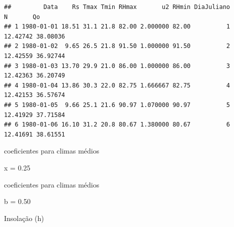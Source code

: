 \documentclass[
]{book}
\newenvironment{Shaded}{\begin{snugshade}}{\end{snugshade}}
\newcommand{\FloatTok}[1]{\textcolor[rgb]{0.00,0.00,0.81}{#1}}
\newcommand{\NormalTok}[1]{#1}
\newcommand{\OperatorTok}[1]{\textcolor[rgb]{0.81,0.36,0.00}{\textbf{#1}}}
\newcommand{\StringTok}[1]{\textcolor[rgb]{0.31,0.60,0.02}{#1}}
\begin{document}
\begin{verbatim}
##         Data    Rs Tmax Tmin RHmax       u2 RHmin DiaJuliano        N       Qo
## 1 1980-01-01 18.51 31.1 21.8 82.00 2.000000 82.00          1 12.42742 38.08036
## 2 1980-01-02  9.65 26.5 21.8 91.50 1.000000 91.50          2 12.42559 36.92744
## 3 1980-01-03 13.70 29.9 21.0 86.00 1.000000 86.00          3 12.42363 36.20749
## 4 1980-01-04 13.86 30.3 22.0 82.75 1.666667 82.75          4 12.42153 36.57674
## 5 1980-01-05  9.66 25.1 21.6 90.97 1.070000 90.97          5 12.41929 37.71584
## 6 1980-01-06 16.10 31.2 20.8 80.67 1.380000 80.67          6 12.41691 38.61551
\end{verbatim}

coeficientes para climas médios

\begin{Shaded}
\begin{Highlighting}[]
\NormalTok{x =}\StringTok{ }\FloatTok{0.25}
\end{Highlighting}
\end{Shaded}

coeficientes para climas médios

\begin{Shaded}
\begin{Highlighting}[]
\NormalTok{ b =}\StringTok{ }\FloatTok{0.50}
\end{Highlighting}
\end{Shaded}

Insolação (h)

\begin{Shaded}
\end{Shaded}
\end{document}
